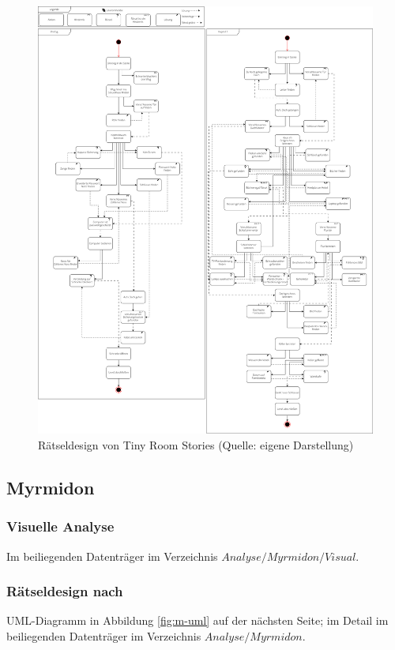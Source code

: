 \documentclass[
	12pt,
	a4paper,
	bibtotoc,
	cleardoubleempty, 
	idxtotoc,
	ngerman,
	openright
	final,
	listof=nochaptergap,
	]{scrbook}
\begin{document}
\begin{appendices}
\newpage

\begin{figure}[ht]
\centering
\includegraphics[width=1\linewidth]{content/pictures/TinyRoomStoriesUML.png}
\caption{Rätseldesign von Tiny Room Stories (Quelle: eigene Darstellung)}
\label{fig:trs-uml}
\end{figure}

\clearpage

\subsection{Myrmidon}\label{sec:append_anylsis_m}

\subsubsection{Visuelle Analyse}\label{sec:append_anylsis_m_visual}
Im beiliegenden Datenträger im Verzeichnis $Analyse/Myrmidon/Visual$.

\subsubsection{Rätseldesign nach \cite{tim_schafer_grim_1996}}\label{sec:append_riddles_m}
UML-Diagramm in Abbildung \ref{fig:m-uml} auf der nächsten Seite; im Detail im beiliegenden Datenträger im Verzeichnis $Analyse/Myrmidon$.


\end{appendices}
\end{document}
